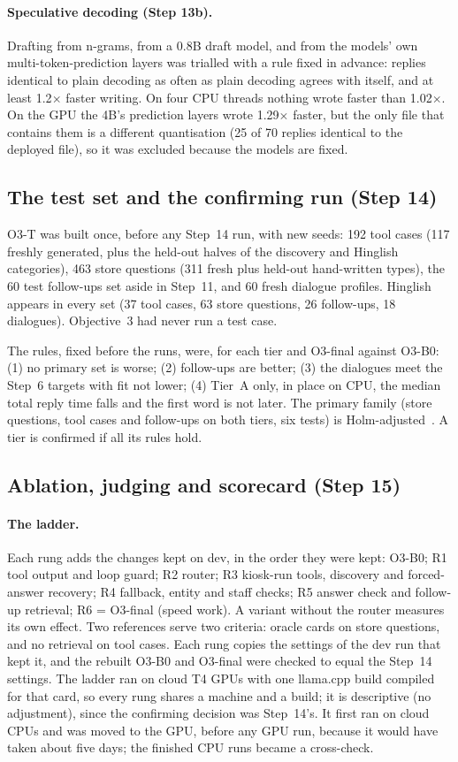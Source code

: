 \documentclass[11pt,a4paper]{article}
\begin{document}
\paragraph{Speculative decoding (Step 13b).} Drafting from n-grams, from a 0.8B draft model, and from the models' own
multi-token-prediction layers was trialled with a rule fixed in advance: replies identical to plain decoding as often as
plain decoding agrees with itself, and at least 1.2$\times$ faster writing. On four CPU threads nothing wrote faster than
1.02$\times$. On the GPU the 4B's prediction layers wrote 1.29$\times$ faster, but the only file that contains them is a
different quantisation (25 of 70 replies identical to the deployed file), so it was excluded because the models are fixed.

\subsection{The test set and the confirming run (Step 14)}
O3-T was built once, before any Step~14 run, with new seeds: 192 tool cases (117 freshly generated, plus the held-out
halves of the discovery and Hinglish categories), 463 store questions (311 fresh plus held-out hand-written types), the
60 test follow-ups set aside in Step~11, and 60 fresh dialogue profiles. Hinglish appears in every set (37 tool cases,
63 store questions, 26 follow-ups, 18 dialogues). Objective~3 had never run a test case.

The rules, fixed before the runs, were, for each tier and O3-final against O3-B0: (1) no primary set is worse; (2)
follow-ups are better; (3) the dialogues meet the Step~6 targets with fit not lower; (4) Tier~A only, in place on CPU,
the median total reply time falls and the first word is not later. The primary family (store questions, tool cases and
follow-ups on both tiers, six tests) is Holm-adjusted~\cite{holm}. A tier is confirmed if all its rules hold.

\subsection{Ablation, judging and scorecard (Step 15)}
\paragraph{The ladder.} Each rung adds the changes kept on dev, in the order they were kept: O3-B0; R1 tool output and
loop guard; R2 router; R3 kiosk-run tools, discovery and forced-answer recovery; R4 fallback, entity and staff checks;
R5 answer check and follow-up retrieval; R6 = O3-final (speed work). A variant without the router measures its own
effect. Two references serve two criteria: oracle cards on store questions, and no retrieval on tool cases. Each rung
copies the settings of the dev run that kept it, and the rebuilt O3-B0 and O3-final were checked to equal the Step~14
settings. The ladder ran on cloud T4 GPUs with one llama.cpp build compiled for that card, so every rung shares a
machine and a build; it is descriptive (no adjustment), since the confirming decision was Step~14's. It first ran on
cloud CPUs and was moved to the GPU, before any GPU run, because it would have taken about five days; the finished CPU
runs became a cross-check.
\end{document}
